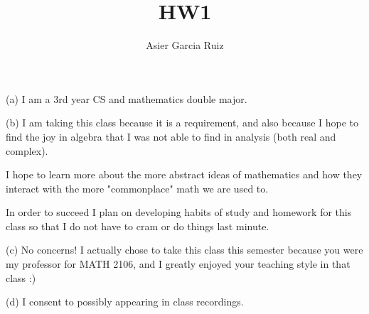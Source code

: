 \documentclass{article}
\title{HW1}
\author{Asier Garcia Ruiz}
\begin{document}
\maketitle

\section{}
 (a) I am a 3rd year CS and mathematics double major.

(b) I am taking this class because it is a requirement, and also because I hope to
find the joy in algebra that I was not able to find in analysis (both real and complex).

I hope to learn more about the more abstract ideas of mathematics and how they
interact with the more "commonplace" math we are used to.

In order to succeed
I plan on developing habits of study and homework for this class so that I do
not have to cram or do things last minute.

(c) No concerns! I actually chose to take this class this semester because
you were my professor for MATH 2106, and I greatly enjoyed your teaching style in
that class :)

(d) I consent to possibly appearing in class recordings.
\end{document}
